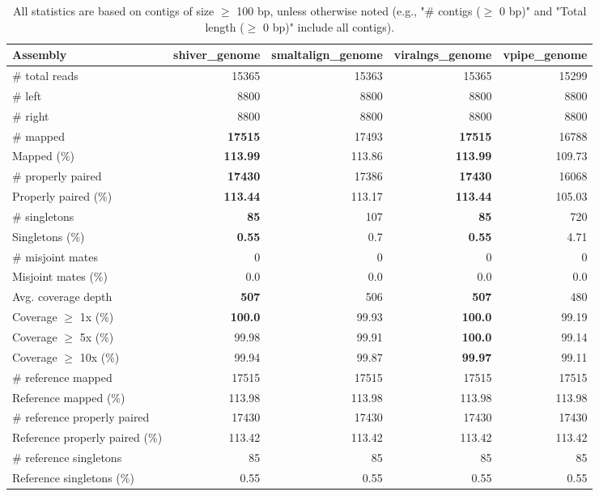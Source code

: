 \documentclass[12pt,a4paper]{article}
\begin{document}
\begin{table}[ht]
\begin{center}
\caption{All statistics are based on contigs of size $\geq$ 100 bp, unless otherwise noted (e.g., "\# contigs ($\geq$ 0 bp)" and "Total length ($\geq$ 0 bp)" include all contigs).}
\begin{tabular}{|l*{4}{|r}|}
\hline
Assembly & shiver\_genome & smaltalign\_genome & viralngs\_genome & vpipe\_genome \\ \hline
\# total reads & 15365 & 15363 & 15365 & 15299 \\ \hline
\# left & 8800 & 8800 & 8800 & 8800 \\ \hline
\# right & 8800 & 8800 & 8800 & 8800 \\ \hline
\# mapped & {\bf 17515} & 17493 & {\bf 17515} & 16788 \\ \hline
Mapped (\%) & {\bf 113.99} & 113.86 & {\bf 113.99} & 109.73 \\ \hline
\# properly paired & {\bf 17430} & 17386 & {\bf 17430} & 16068 \\ \hline
Properly paired (\%) & {\bf 113.44} & 113.17 & {\bf 113.44} & 105.03 \\ \hline
\# singletons & {\bf 85} & 107 & {\bf 85} & 720 \\ \hline
Singletons (\%) & {\bf 0.55} & 0.7 & {\bf 0.55} & 4.71 \\ \hline
\# misjoint mates & 0 & 0 & 0 & 0 \\ \hline
Misjoint mates (\%) & 0.0 & 0.0 & 0.0 & 0.0 \\ \hline
Avg. coverage depth & {\bf 507} & 506 & {\bf 507} & 480 \\ \hline
Coverage $\geq$ 1x (\%) & {\bf 100.0} & 99.93 & {\bf 100.0} & 99.19 \\ \hline
Coverage $\geq$ 5x (\%) & 99.98 & 99.91 & {\bf 100.0} & 99.14 \\ \hline
Coverage $\geq$ 10x (\%) & 99.94 & 99.87 & {\bf 99.97} & 99.11 \\ \hline
\# reference mapped & 17515 & 17515 & 17515 & 17515 \\ \hline
Reference mapped (\%) & 113.98 & 113.98 & 113.98 & 113.98 \\ \hline
\# reference properly paired & 17430 & 17430 & 17430 & 17430 \\ \hline
Reference properly paired (\%) & 113.42 & 113.42 & 113.42 & 113.42 \\ \hline
\# reference singletons & 85 & 85 & 85 & 85 \\ \hline
Reference singletons (\%) & 0.55 & 0.55 & 0.55 & 0.55 \\ \hline

\end{tabular}
\end{center}
\end{table}
\end{document}
